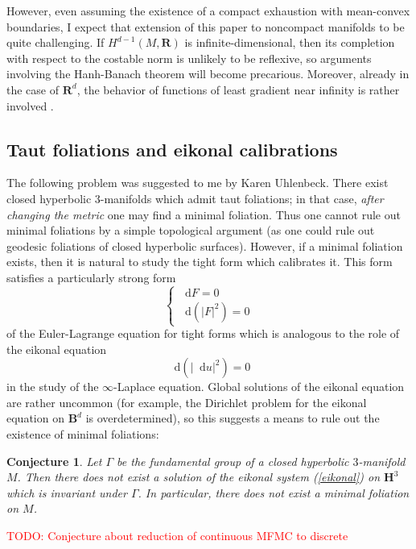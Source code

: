 \documentclass[reqno,11pt]{amsart}
\newcommand{\RR}{\mathbf{R}}
\newcommand{\Hyp}{\mathbf H}
\newcommand{\Ball}{\mathbf{B}}
\newcommand*\dif{\mathop{}\!\mathrm{d}}
\newtheorem{conjecture}[theorem]{Conjecture}
\theoremstyle{definition}
\numberwithin{equation}{section}
\newcommand\todo[1]{\textcolor{red}{TODO: #1}}
\begin{document}
However, even assuming the existence of a compact exhaustion with mean-convex boundaries, I expect that extension of this paper to noncompact manifolds to be quite challenging.
If $H^{d - 1}(M, \RR)$ is infinite-dimensional, then its completion with respect to the costable norm is unlikely to be reflexive, so arguments involving the Hanh-Banach theorem will become precarious.
Moreover, already in the case of $\RR^d$, the behavior of functions of least gradient near infinity is rather involved \cite[\S4.4]{górny2021}.


\subsection{Taut foliations and eikonal calibrations}
The following problem was suggested to me by Karen Uhlenbeck. 
There exist closed hyperbolic $3$-manifolds which admit taut foliations; in that case, \emph{after changing the metric} one may find a minimal foliation.
Thus one cannot rule out minimal foliations by a simple topological argument (as one could rule out geodesic foliations of closed hyperbolic surfaces).
However, if a minimal foliation exists, then it is natural to study the tight form which calibrates it.
This form satisfies a particularly strong form 
\begin{equation}\label{eikonal}
\begin{cases}\dif F = 0 \\ \dif(|F|^2) = 0\end{cases}
\end{equation}
of the Euler-Lagrange equation for tight forms which is analogous to the role of the eikonal equation
$$\dif(|\dif u|^2) = 0$$
in the study of the $\infty$-Laplace equation.
Global solutions of the eikonal equation are rather uncommon (for example, the Dirichlet problem for the eikonal equation on $\Ball^d$ is overdetermined), so this suggests a means to rule out the existence of minimal foliations:

\begin{conjecture}\label{Karen}
Let $\Gamma$ be the fundamental group of a closed hyperbolic $3$-manifold $M$.
Then there does not exist a solution of the eikonal system (\ref{eikonal}) on $\Hyp^3$ which is invariant under $\Gamma$.
In particular, there does not exist a minimal foliation on $M$.
\end{conjecture}

\todo{Conjecture about reduction of continuous MFMC to discrete}
\end{document}
